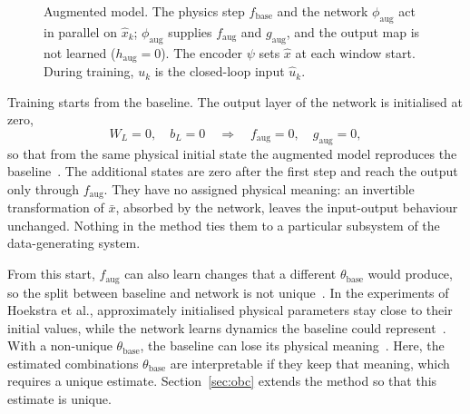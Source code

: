 \begin{figure}[t]
 \centering
 \resizebox{\columnwidth}{!}{}
 \caption{Augmented model. The physics step $f_{\mathrm{base}}$ and the
 network $\phi_{\mathrm{aug}}$ act in parallel on $\hat x_k$;
 $\phi_{\mathrm{aug}}$ supplies $f_{\mathrm{aug}}$ and $g_{\mathrm{aug}}$,
 and the output map is not learned ($h_{\mathrm{aug}}=0$). The encoder
 $\psi$ sets $\hat x$ at each window start. During training, $u_k$ is the
 closed-loop input $\hat u_k$.
 }
 \label{fig:aug_structure}
\end{figure}

Training starts from the baseline.
The output layer of the network is initialised at zero,
\begin{equation}
 W_L=0,\quad b_L=0
 \quad\Longrightarrow\quad
 f_{\mathrm{aug}}=0,\quad g_{\mathrm{aug}}=0,
 \label{eq:aug_zero_init}
\end{equation}
so that from the same physical initial state the augmented model reproduces
the baseline~\cite[Eq.~(29)]{hoekstra2026lfr}.
The additional states are zero after the first step and reach the output only
through $f_{\mathrm{aug}}$.
They have no assigned physical meaning: an invertible transformation of
$\bar x$, absorbed by the network, leaves the input-output behaviour
unchanged.
Nothing in the method ties them to a particular subsystem of the
data-generating system.

From this start, $f_{\mathrm{aug}}$ can also learn changes that a different
$\theta_{\mathrm{base}}$ would produce, so the split between baseline and
network is not unique~\cite[Sec.~5.2]{hoekstra2026lfr}.
In the experiments of Hoekstra et al., approximately initialised physical
parameters stay close to their initial values, while the network learns
dynamics the baseline could represent~\cite[Sec.~6.3]{hoekstra2026lfr}.
With a non-unique $\theta_{\mathrm{base}}$, the baseline can lose its physical
meaning~\cite[Sec.~3]{gyorok2026obc}.
Here, the estimated combinations $\theta_{\mathrm{base}}$ are interpretable if
they keep that meaning, which requires a unique estimate.
Section~\ref{sec:obc} extends the method so that this estimate is unique.

